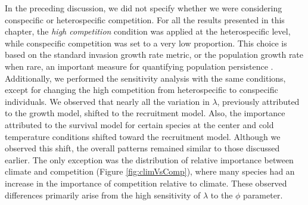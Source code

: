 In the preceding discussion, we did not specify whether we were
considering conspecific or heterospecific competition. For all the
results presented in this chapter, the \emph{high competition} condition
was applied at the heterospecific level, while conspecific competition
was set to a very low proportion. This choice is based on the standard
invasion growth rate metric, or the population growth rate when rare, an
important measure for quantifying population persistence
\citep{lewontin1969}.\\

Additionally, we performed the sensitivity analysis with the same
conditions, except for changing the high competition from heterospecific
to conspecific individuals. We observed that nearly all the variation in
\(\lambda\), previously attributed to the growth model, shifted to the
recruitment model. Also, the importance attributed to the survival model
for certain species at the center and cold temperature conditions
shifted toward the recruitment model. Although we observed this shift,
the overall patterns remained similar to those discussed earlier. The
only exception was the distribution of relative importance between
climate and competition (Figure \ref{fig:climVsComp}), where many
species had an increase in the importance of competition relative to
climate. These observed differences primarily arise from the high
sensitivity of \(\lambda\) to the \(\phi\) parameter.\\

\singlespacing
{\renewcommand{\bibname}{References}
\renewcommand{\bibsection}{\section{\bibname}}
}

